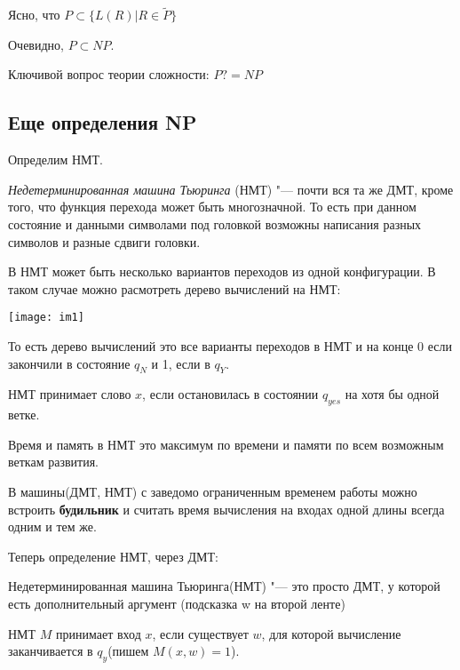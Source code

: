 \begin{Rem}
	Ясно, что $P \subset \{L(R)|R \in \tilde{P}\}$
\end{Rem}

Очевидно, $P \subset NP$.

\begin{Rem}
Ключивой вопрос теории сложности: $P ?= NP$
\end{Rem}


\subsection{Еще определения NP}
Определим НМТ.
\begin{Def}
	\textit{Недетерминированная машина Тьюринга} (НМТ) "--- почти вся та же ДМТ, кроме того, что функция перехода может быть многозначной. 
	То есть при данном состояние и данными символами под головкой возможны написания разных символов и разные сдвиги головки. 
\end{Def}

В НМТ может быть несколько вариантов переходов из одной конфигурации. 
В таком случае можно расмотреть дерево вычислений на НМТ:

\texttt{[image: im1]}

То есть дерево вычислений это все варианты переходов в НМТ и на конце 0 если закончили в состояние $q_N$ и 1, если в $q_Y$. 

\begin{Def}
	НМТ принимает слово $x$, если остановилась в состоянии $q_{yes}$ на хотя бы одной ветке.
\end{Def}

\begin{Def}
	Время и память в НМТ это максимум по времени и памяти по всем возможным веткам развития. 
\end{Def}

\begin{Rem}
	В машины(ДМТ, НМТ) с заведомо ограниченным временем работы можно встроить \textbf{будильник} и считать время вычисления на входах одной 
	длины всегда одним и тем же. 
\end{Rem}

Теперь определение НМТ, через ДМТ:
\begin{Def}
	Недетерминированная машина Тьюринга(НМТ) "--- это просто ДМТ, у которой есть дополнительный аргумент (подсказка w на второй ленте)
\end{Def}

\begin{Def}
	НМТ $M$ принимает вход $x$, если существует $w$, для которой вычисление заканчивается в $q_y$(пишем $M(x, w) = 1$).\\
\end{Def}

